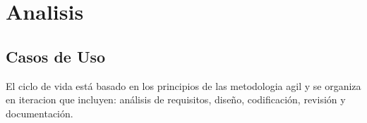 \pagestyle{myStyle}
\setcounter{page}{1}
\chapter[Analisis]{
  \label{chp:analisis}
  Analisis
}


\pagestyle{myStyle}
\section{Casos de Uso}

El ciclo de vida está basado en los principios de las metodologia agil y
se organiza en iteracion que incluyen: análisis de requisitos,
diseño, codificación, revisión y documentación.

\begin{center}
\end{center}

